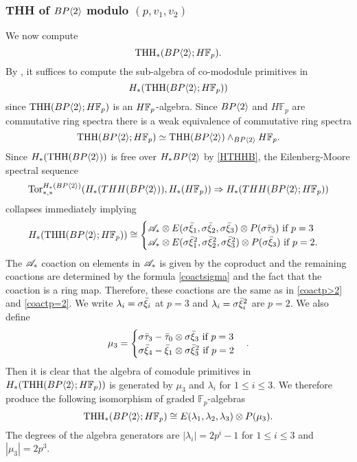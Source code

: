 \subsubsection{THH of $BP\langle 2 \rangle$ modulo $(p,v_1,v_2)$}
We now compute %
\[\operatorname{THH}_*(BP\langle 2 \rangle;H\mathbb{F}_p).\] 
By \cite[Lem. 4.1]{AngeltveitRognes}, it suffices to compute the sub-algebra of co-mododule primitives in 
\[H_*(\operatorname{THH}(BP\langle 2 \rangle;H\mathbb{F}_p))\] 
since $\operatorname{THH}(BP\langle 2 \rangle;H\mathbb{F}_p)$ is an $H\mathbb{F}_p$-algebra. Since $BP\langle 2 \rangle$ and $H\mathbb{F}_p$ are commutative ring spectra there is a weak equivalence of commutative ring spectra
\[ \operatorname{THH}(BP\langle 2 \rangle;H\mathbb{F}_p)\simeq \operatorname{THH}(BP\langle 2 \rangle)\wedge_{BP\langle 2 \rangle} H\mathbb{F}_p. \] 
Since $H_*(\operatorname{THH}(BP\langle 2 \rangle))$ is free over $H_*BP\langle 2 \rangle$ by \eqref{HTHHB}, the Eilenberg-Moore spectral sequence 
\[\operatorname{Tor}_{*,*}^{H_*(BP\langle 2 \rangle)}(H_*(THH(BP\langle 2 \rangle)),H_*(H\mathbb{F}_p))\Rightarrow H_*(THH(BP\langle 2 \rangle;H\mathbb{F}_p))\]
collapses immediately implying
\begin{equation}\label{eqn:HTHH(R;F_p)}
H_*(\operatorname{THH}(BP\langle 2 \rangle;H\mathbb{F}_p))\cong \begin{cases} \mathscr{A}_* \otimes E(\sigma \bar{\xi}_1, \sigma \bar{\xi}_2, \sigma \bar{\xi}_3)\otimes P(\sigma \bar{\tau}_3) \text{ if } p=3 \\  \mathscr{A}_* \otimes E(\sigma \bar{\xi}_1^2, \sigma \bar{\xi}_2^2, \sigma \bar{\xi}_3^2)\otimes P(\sigma \bar{\xi}_3) \text{ if } p=2. \end{cases}
\end{equation}
The $\mathscr{A}_*$ coaction on elements in $\mathscr{A}_*$ is given by the coproduct and the remaining coactions are determined by the formula \eqref{coactsigma} and the fact that the coaction is a ring map. Therefore, these coactions are the same as in \eqref{coactp>2} and \eqref{coactp=2}. We write $\lambda_i=\sigma\bar{\xi}_i$ at $p=3$ and $\lambda_i=\sigma \bar{\xi}_i^2$ are $p=2$. We also define 
\[ \mu_3=\begin{cases} \sigma \bar{\tau}_3 -\bar{\tau}_0\otimes \sigma \bar{\xi}_3 \text{ if } p=3 \\ \sigma \bar{\xi}_4-\bar{\xi}_1\otimes \sigma \bar{\xi}^2_3 \text{ if } p=2 \end{cases}. \]
Then it is clear that the algebra of comodule primitives in $H_*(\operatorname{THH}(BP\langle 2 \rangle ;H\mathbb{F}_p))$ is generated by $\mu_3$ and $\lambda_i$ for $1\le i\le 3$. We therefore produce the following isomorphism of graded $\mathbb{F}_p$-algebras
\begin{equation}\label{eqn:THH(R;F_p)}
\operatorname{THH}_*(BP\langle 2 \rangle;H\mathbb{F}_p)\cong E(\lambda_1, \lambda_2, \lambda_3)\otimes P(\mu_3).
\end{equation}
The degrees of the algebra generators are $|\lambda_i|=2p^i-1$ for $1\le i\le 3$ and $|\mu_3| = 2p^3$. 

